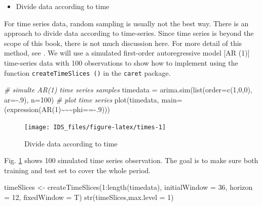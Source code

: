 \documentclass[
  12pt,
]{krantz}
\makeatletter
\newenvironment{Shaded}{\begin{snugshade}}{\end{snugshade}}
\newcommand{\AttributeTok}[1]{\textcolor[rgb]{0.61,0.61,0.61}{#1}}
\newcommand{\CommentTok}[1]{\textcolor[rgb]{0.37,0.37,0.37}{\textit{#1}}}
\newcommand{\DecValTok}[1]{\textcolor[rgb]{0.06,0.06,0.06}{#1}}
\newcommand{\ErrorTok}[1]{\textcolor[rgb]{0.14,0.14,0.14}{\textbf{#1}}}
\newcommand{\FunctionTok}[1]{\textcolor[rgb]{0,0,0}{#1}}
\newcommand{\NormalTok}[1]{#1}
\newcommand{\OtherTok}[1]{\textcolor[rgb]{0.37,0.37,0.37}{#1}}
\newcommand{\SpecialCharTok}[1]{\textcolor[rgb]{0,0,0}{#1}}
\providecommand{\tightlist}{%
  \setlength{\itemsep}{0pt}\setlength{\parskip}{0pt}}
\newenvironment{kframe}{%
\medskip{}
\setlength{\fboxsep}{.8em}
 \def\at@end@of@kframe{}%
 \ifinner\ifhmode%
  \def\at@end@of@kframe{\end{minipage}}%
  \begin{minipage}{\columnwidth}%
 \fi\fi%
 \def\FrameCommand##1{\hskip\@totalleftmargin \hskip-\fboxsep
 \colorbox{shadecolor}{##1}\hskip-\fboxsep
     \hskip-\linewidth \hskip-\@totalleftmargin \hskip\columnwidth}%
 \MakeFramed {\advance\hsize-\width
   \@totalleftmargin\z@ \linewidth\hsize
   \@setminipage}}%
 {\par\unskip\endMakeFramed%
 \at@end@of@kframe}
\renewenvironment{Shaded}{\begin{kframe}}{\end{kframe}}
\makeatother
\begin{document}
\begin{itemize}
\tightlist
\item
  Divide data according to time
\end{itemize}

For time series data, random sampling is usually not the best way. There is an approach to divide data according to time-series. Since time series is beyond the scope of this book, there is not much discussion here. For more detail of this method, see \citep{Hyndman}. We will use a simulated first-order autoregressive model {[}AR (1){]} time-series data with 100 observations to show how to implement using the function \texttt{createTimeSlices\ ()} in the \texttt{caret} package.

\begin{Shaded}
\begin{Highlighting}[]
\CommentTok{\# simulte AR(1) time series samples}
\NormalTok{timedata }\OtherTok{=} \FunctionTok{arima.sim}\NormalTok{(}\FunctionTok{list}\NormalTok{(}\AttributeTok{order=}\FunctionTok{c}\NormalTok{(}\DecValTok{1}\NormalTok{,}\DecValTok{0}\NormalTok{,}\DecValTok{0}\NormalTok{), }\AttributeTok{ar=}\SpecialCharTok{{-}}\NormalTok{.}\DecValTok{9}\NormalTok{), }\AttributeTok{n=}\DecValTok{100}\NormalTok{)}
\CommentTok{\# plot time series}
\FunctionTok{plot}\NormalTok{(timedata, }\AttributeTok{main=}\NormalTok{(}\FunctionTok{expression}\NormalTok{(}\FunctionTok{AR}\NormalTok{(}\DecValTok{1}\NormalTok{)}\SpecialCharTok{\textasciitilde{}}\ErrorTok{\textasciitilde{}\textasciitilde{}}\NormalTok{phi}\SpecialCharTok{=={-}}\NormalTok{.}\DecValTok{9}\NormalTok{)))     }
\end{Highlighting}
\end{Shaded}

\begin{figure}

{\centering \texttt{[image: IDS\_files/figure-latex/times-1]} 

}

\caption{Divide data according to time}\label{fig:times}
\end{figure}

Fig. \ref{fig:times} shows 100 simulated time series observation. The goal is to make sure both training and test set to cover the whole period.

\begin{Shaded}
\begin{Highlighting}[]
\NormalTok{timeSlices }\OtherTok{\textless{}{-}} \FunctionTok{createTimeSlices}\NormalTok{(}\DecValTok{1}\SpecialCharTok{:}\FunctionTok{length}\NormalTok{(timedata), }
                   \AttributeTok{initialWindow =} \DecValTok{36}\NormalTok{, }
                   \AttributeTok{horizon =} \DecValTok{12}\NormalTok{, }
                   \AttributeTok{fixedWindow =}\NormalTok{ T)}
\FunctionTok{str}\NormalTok{(timeSlices,}\AttributeTok{max.level =} \DecValTok{1}\NormalTok{)}
\end{Highlighting}
\end{Shaded}
\end{document}
